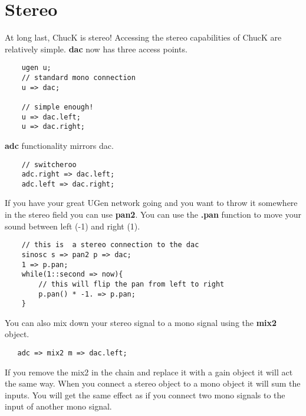\section{Stereo}

At long last, ChucK is stereo! Accessing the stereo capabilities of ChucK are relatively simple. {\bf dac} now has three access points. 

\begin{verbatim}
    ugen u;
    // standard mono connection
    u => dac;

    // simple enough!
    u => dac.left;
    u => dac.right;
\end{verbatim}

{\bf adc} functionality mirrors dac. 

\begin{verbatim}
    // switcheroo
    adc.right => dac.left;
    adc.left => dac.right;
\end{verbatim}

If you have your great UGen network going and you want to throw it somewhere in the stereo field you can use {\bf pan2}. You can use the {\bf .pan} function to move your sound between left (-1) and right (1).

\begin{verbatim}
    // this is  a stereo connection to the dac
    sinosc s => pan2 p => dac;
    1 => p.pan;
    while(1::second => now){
        // this will flip the pan from left to right
        p.pan() * -1. => p.pan;
    }
\end{verbatim}


You can also mix down your stereo signal to a mono signal using the {\bf mix2} object. 

\begin{verbatim}
   adc => mix2 m => dac.left;
\end{verbatim}

If you remove the mix2 in the chain and replace it with a gain object it will act the same way. When you connect a stereo object to a mono object it will sum the inputs. You will get the same effect as if you connect two mono signals to the input of another mono signal. 